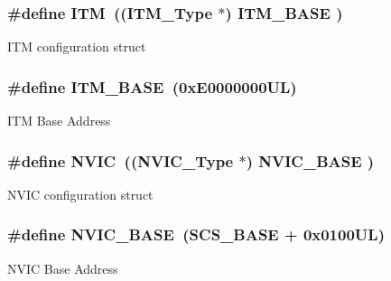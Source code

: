 \subsubsection[{\texorpdfstring{I\+TM}{ITM}}]{\setlength{\rightskip}{0pt plus 5cm}\#define I\+TM~(({\bf I\+T\+M\+\_\+\+Type}       $\ast$)     {\bf I\+T\+M\+\_\+\+B\+A\+SE}      )}\hypertarget{group___c_m_s_i_s__core__base_gabae7cdf882def602cb787bb039ff6a43}{}\label{group___c_m_s_i_s__core__base_gabae7cdf882def602cb787bb039ff6a43}
I\+TM configuration struct 
\subsubsection[{\texorpdfstring{I\+T\+M\+\_\+\+B\+A\+SE}{ITM_BASE}}]{\setlength{\rightskip}{0pt plus 5cm}\#define I\+T\+M\+\_\+\+B\+A\+SE~(0x\+E0000000\+U\+L)}\hypertarget{group___c_m_s_i_s__core__base_gadd76251e412a195ec0a8f47227a8359e}{}\label{group___c_m_s_i_s__core__base_gadd76251e412a195ec0a8f47227a8359e}
I\+TM Base Address 
\subsubsection[{\texorpdfstring{N\+V\+IC}{NVIC}}]{\setlength{\rightskip}{0pt plus 5cm}\#define N\+V\+IC~(({\bf N\+V\+I\+C\+\_\+\+Type}      $\ast$)     {\bf N\+V\+I\+C\+\_\+\+B\+A\+SE}     )}\hypertarget{group___c_m_s_i_s__core__base_gac8e97e8ce56ae9f57da1363a937f8a17}{}\label{group___c_m_s_i_s__core__base_gac8e97e8ce56ae9f57da1363a937f8a17}
N\+V\+IC configuration struct 
\subsubsection[{\texorpdfstring{N\+V\+I\+C\+\_\+\+B\+A\+SE}{NVIC_BASE}}]{\setlength{\rightskip}{0pt plus 5cm}\#define N\+V\+I\+C\+\_\+\+B\+A\+SE~({\bf S\+C\+S\+\_\+\+B\+A\+SE} +  0x0100\+U\+L)}\hypertarget{group___c_m_s_i_s__core__base_gaa0288691785a5f868238e0468b39523d}{}\label{group___c_m_s_i_s__core__base_gaa0288691785a5f868238e0468b39523d}
N\+V\+IC Base Address 
